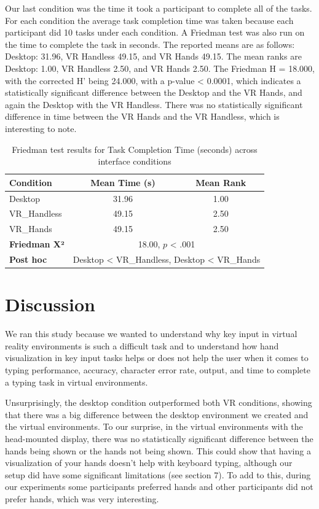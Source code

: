 \documentclass[acmlarge]{acmart}
\begin{document}
Our last condition was the time it took a participant to complete all of the tasks. For each condition the average task completion time was taken because each participant did 10 tasks under each condition. A Friedman test was also run on the time to complete the task in seconds. The reported means are as follows: Desktop: 31.96, VR Handless 49.15, and VR Hands 49.15. The mean ranks are Desktop: 1.00, VR Handless 2.50, and VR Hands 2.50. The Friedman H = 18.000, with the corrected H' being 24.000, with a p-value < 0.0001, which indicates a statistically significant difference between the Desktop and the VR Hands, and again the Desktop with the VR Handless. There was no statistically significant difference in time between the VR Hands and the VR Handless, which is interesting to note. 



\begin{table}[ht]
\centering
\caption{Friedman test results for Task Completion Time (seconds) across interface conditions}
\label{tab:time_friedman}
\begin{tabular}{lcc}
\toprule
\textbf{Condition} & \textbf{Mean Time (s)} & \textbf{Mean Rank} \\
\midrule
Desktop     & 31.96  & 1.00 \\
VR\_Handless & 49.15  & 2.50 \\
VR\_Hands    & 49.15  & 2.50 \\
\midrule
\textbf{Friedman X²} & \multicolumn{2}{c}{18.00, $p$ < .001} \\
\textbf{Post hoc} & \multicolumn{2}{c}{Desktop < VR\_Handless, Desktop < VR\_Hands} \\
\bottomrule
\end{tabular}
\end{table}



 

\section{Discussion}
We ran this study because we wanted to understand why key input in virtual reality environments is such a difficult task and to understand how hand visualization in key input tasks helps or does not help the user when it comes to typing performance, accuracy, character error rate, output, and time to complete a typing task in virtual environments. 

Unsurprisingly, the desktop condition outperformed both VR conditions, showing that there was a big difference between the desktop environment we created and the virtual environments. To our surprise, in the virtual environments with the head-mounted display, there was no statistically significant difference between the hands being shown or the hands not being shown. This could show that having a visualization of your hands doesn't help with keyboard typing, although our setup did have some significant limitations (see section 7). To add to this, during our experiments some participants preferred hands and other participants did not prefer hands, which was very interesting. 
\end{document}
